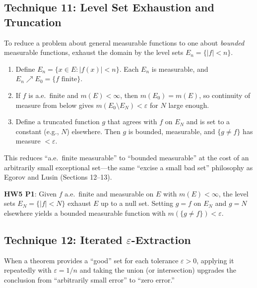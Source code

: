 \documentclass[11pt]{report}
\begin{document}
\subsection{Technique 11: Level Set Exhaustion and Truncation}

To reduce a problem about general measurable functions to one about \textit{bounded} measurable functions, exhaust the domain by the level sets $E_n = \{|f| < n\}$.

\begin{rembox}[Strategy]
\begin{enumerate}[label=(\roman*)]
\item Define $E_n = \{x \in E : |f(x)| < n\}$. Each $E_n$ is measurable, and $E_n \nearrow E_0 = \{f \text{ finite}\}$.
\item If $f$ is a.e.\ finite and $m(E) < \infty$, then $m(E_0) = m(E)$, so continuity of measure from below gives $m(E_0 \setminus E_N) < \varepsilon$ for $N$ large enough.
\item Define a truncated function $g$ that agrees with $f$ on $E_N$ and is set to a constant (e.g., $N$) elsewhere. Then $g$ is bounded, measurable, and $\{g \neq f\}$ has measure $< \varepsilon$.
\end{enumerate}
This reduces ``a.e.\ finite measurable'' to ``bounded measurable'' at the cost of an arbitrarily small exceptional set---the same ``excise a small bad set'' philosophy as Egorov and Lusin (Sections 12--13).
\end{rembox}

\begin{exbox}[Application (HW5)]
\textbf{HW5 P1}: Given $f$ a.e.\ finite and measurable on $E$ with $m(E) < \infty$, the level sets $E_N = \{|f| < N\}$ exhaust $E$ up to a null set. Setting $g = f$ on $E_N$ and $g = N$ elsewhere yields a bounded measurable function with $m(\{g \neq f\}) < \varepsilon$.
\end{exbox}

\subsection{Technique 12: Iterated $\varepsilon$-Extraction}

When a theorem provides a ``good'' set for each tolerance $\varepsilon > 0$, applying it repeatedly with $\varepsilon = 1/n$ and taking the union (or intersection) upgrades the conclusion from ``arbitrarily small error'' to ``zero error.''
\end{document}
